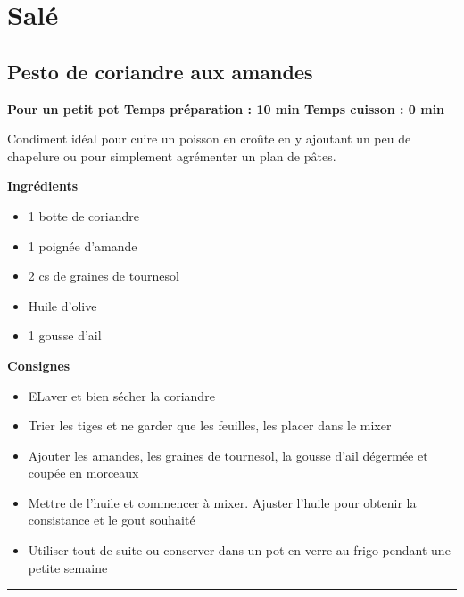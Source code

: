 \documentclass[]{book}
\providecommand{\tightlist}{%
  \setlength{\itemsep}{0pt}\setlength{\parskip}{0pt}}
\begin{document}
\section*{Salé}\label{saluxe9-2}

\subsection*{\texorpdfstring{{Pesto de coriandre aux
amandes}}{Pesto de coriandre aux amandes}}\label{pesto-de-coriandre-aux-amandes}

\begin{salebox}
\textbf{Pour un petit pot \textbar{} Temps préparation : 10 min
\textbar{} Temps cuisson : 0 min}

Condiment idéal pour cuire un poisson en croûte en y ajoutant un peu de
chapelure ou pour simplement agrémenter un plan de pâtes.
\end{salebox}

 \textbf{Ingrédients}

\begin{itemize}
\tightlist
\item
  1 botte de coriandre
\item
  1 poignée d'amande
\item
  2 cs de graines de tournesol
\item
  Huile d'olive
\item
  1 gousse d'ail
\end{itemize}

\textbf{Consignes}

\begin{itemize}
\tightlist
\item
  ELaver et bien sécher la coriandre
\item
  Trier les tiges et ne garder que les feuilles, les placer dans le
  mixer
\item
  Ajouter les amandes, les graines de tournesol, la gousse d'ail
  dégermée et coupée en morceaux
\item
  Mettre de l'huile et commencer à mixer. Ajuster l'huile pour obtenir
  la consistance et le gout souhaité
\item
  Utiliser tout de suite ou conserver dans un pot en verre au frigo
  pendant une petite semaine
\end{itemize}

\begin{center}\rule{0.5\linewidth}{0.5pt}\end{center}
\end{document}
